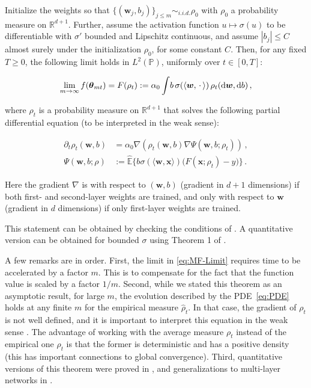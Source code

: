 \begin{theorem}\label{thm:PDE}
  Initialize the weights so that $\{({\boldsymbol w}_j,b_j)\}_{j\le m}\sim_{i.i.d.} \rho_0$ with $\rho_0$ a probability measure on ${\mathbb R}^{d+1}$. Further, assume the activation function $u\mapsto \sigma(u)$ to be differentiable with $\sigma'$ bounded and Lipschitz continuous, and assume $|b_j|\le C$ almost surely under the initialization $\rho_0$, for some constant $C$. Then, for any fixed $T\ge 0$, the following limit holds  in $L^2(\mathbb{P})$, uniformly over $t\in [0,T]$:

  \begin{align}
\lim_{m\to\infty}f({\boldsymbol \theta}_{mt}) = F(\rho_t) :=\alpha_0\int \! b\,\sigma(\langle{\boldsymbol w},\, \cdot\,\rangle)\, \rho_t({\rm d}{\boldsymbol w},{\rm d} b)\, ,\label{eq:MF-Limit}
  \end{align}

  where $\rho_t$ is a probability measure on ${\mathbb R}^{d+1}$ that solves the following partial differential equation (to be interpreted in the weak sense):

  \begin{align}
    \partial_t\rho_t({\boldsymbol w},b) & = \alpha_0\nabla (\rho_t({\boldsymbol w},b)\nabla \Psi({\boldsymbol w},b;\rho_t))\, ,\label{eq:PDE}\\
    \Psi({\boldsymbol w},b;\rho) & := \widehat{{\mathbb E}}\big\{b\sigma(\langle{\boldsymbol w},{\boldsymbol x}\rangle)\big(F({\boldsymbol x};\rho_t)-y\big)\big\}\, .
     \end{align}

     Here the gradient $\nabla$ is with respect to $({\boldsymbol w},b)$ (gradient in $d+1$ dimensions) if both first- and second-layer weights are trained, and only with respect to ${\boldsymbol w}$ (gradient in $d$ dimensions) if only first-layer weights are trained.
  \end{theorem}

This statement can be obtained by checking the conditions of
\cite[Theorem 2.6]{chizat2018global}. A quantitative version can be obtained for bounded $\sigma$ using Theorem 1 of \cite{mei2019mean}.

  A few remarks are in order. First, the limit in \eqref{eq:MF-Limit} requires time to be accelerated by a factor $m$. This is to compensate for the fact that the function value is scaled by a factor $1/m$. Second, while we stated this theorem as an asymptotic result, for large $m$, the evolution described by the PDE~\eqref{eq:PDE} holds at any finite $m$ for the empirical measure $\widehat{\rho}_t$. In that case, the gradient of
  $\rho_t$ is not well defined, and it is important to interpret this equation in the weak sense \cite{ambrosio2008gradient,santambrogio2015optimal}. The advantage of working with the average measure $\rho_t$ instead of the empirical one $\widehat{\rho}_t$ is that the former is deterministic and has a positive density (this has important connections to global convergence). Third, quantitative versions of this theorem were proved in \cite{mei2018mean,mei2019mean}, and generalizations to multi-layer networks in \cite{nguyen2020rigorous}.

